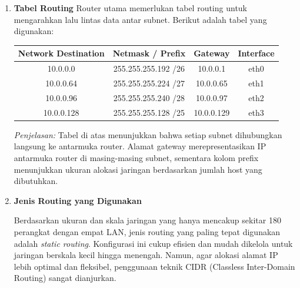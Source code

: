 \begin{enumerate}
    \item \textbf{Tabel Routing}
    Router utama memerlukan tabel routing untuk mengarahkan lalu lintas data antar subnet. Berikut adalah tabel yang digunakan:
    \begin{table}[h]
    \centering
    \renewcommand{\arraystretch}{1.3}
    \begin{tabular}{|c|c|c|c|}
    \hline
    \textbf{Network Destination} & \textbf{Netmask / Prefix} & \textbf{Gateway} & \textbf{Interface} \\ \hline
    10.0.0.0 & 255.255.255.192 /26 & 10.0.0.1 & eth0 \\ \hline
    10.0.0.64 & 255.255.255.224 /27 & 10.0.0.65 & eth1 \\ \hline
    10.0.0.96 & 255.255.255.240 /28 & 10.0.0.97 & eth2 \\ \hline
    10.0.0.128 & 255.255.255.128 /25 & 10.0.0.129 & eth3 \\ \hline
    \end{tabular}
    \end{table}

    \textit{Penjelasan:} Tabel di atas menunjukkan bahwa setiap subnet dihubungkan langsung ke antarmuka router. Alamat gateway merepresentasikan IP antarmuka router di masing-masing subnet, sementara kolom prefix menunjukkan ukuran alokasi jaringan berdasarkan jumlah host yang dibutuhkan.

    \item \textbf{Jenis Routing yang Digunakan}

    Berdasarkan ukuran dan skala jaringan yang hanya mencakup sekitar 180 perangkat dengan empat LAN, jenis routing yang paling tepat digunakan adalah \textit{static routing}. Konfigurasi ini cukup efisien dan mudah dikelola untuk jaringan berskala kecil hingga menengah. Namun, agar alokasi alamat IP lebih optimal dan fleksibel, penggunaan teknik CIDR (Classless Inter-Domain Routing) sangat dianjurkan.
\end{enumerate}